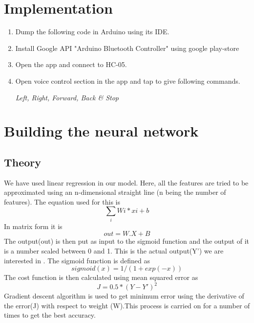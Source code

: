 \documentclass[journal,12pt,twocolumn]{IEEEtran}
\renewcommand\thesection{\arabic{section}}
\begin{document}
\section{Implementation}
\begin{enumerate}[label=\thesection.\arabic*
,ref=\thesection.\theenumi]
\item Dump the following code in Arduino using its IDE.
%
\item Install Google API "Arduino Bluetooth Controller" using google play-store
\item Open the app and connect to HC-05.
\item Open voice control section in the app and tap to give following commands. 

\textit{Left, Right, Forward, Back \& Stop}

\end{enumerate}

\section{Building the neural network}
\subsection{Theory}
We have used linear regression in our model. Here, all the features are tried to be approximated using an n-dimensional straight line (n being the number of features). The equation used for this is 
\begin{equation}
\sum_{i} Wi*xi + b
\end{equation}
In matrix form it is $$ out = W.X + B $$ The output(out) is then put as input to the sigmoid function and the output of it is a number scaled between 0 and 1. This is the actual output(Y') we are interested in .  The sigmoid function is defined as $$sigmoid(x) = 1/(1+exp(-x))$$ The cost function is then calculated using mean squared error as $$ J = 0.5*(Y - Y')^2$$ Gradient descent algorithm is used to get minimum error using the derivative of the error(J) with respect to weight (W).This process is carried on for a number of times to get the best accuracy.
\end{document}
